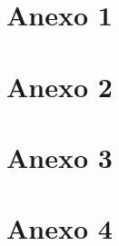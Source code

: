 \documentclass[a4paper]{article}
\begin{document}
\begin{appendices} 
\section{\LARGE \textbf{Anexo 1}}\label{anexo1}

    
\section{\LARGE \textbf{Anexo 2}}\label{anexo2}

    
\section{\LARGE \textbf{Anexo 3}}\label{anexo3}


\section{\LARGE \textbf{Anexo 4}}\label{anexo4}

    
\end{appendices}
\end{document}
